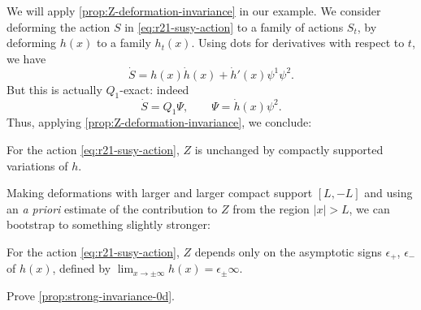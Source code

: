\documentclass[12pt,letterpaper,reqno]{article}
\numberwithin{equation}{section}
\newcommand{\abs}[1]{\lvert#1\rvert}
\newcommand{\IP}[1]{\langle#1\rangle}
\newcommand{\eps}{\epsilon}
\newcommand{\ti}[1]{\textit{#1}}
\begin{document}
We will apply \autoref{prop:Z-deformation-invariance} in our example.
We consider deforming the action $S$ in \eqref{eq:r21-susy-action} 
to a family of actions $S_t$, by deforming $h(x)$
to a family $h_t(x)$.
Using dots for derivatives with respect to $t$, we have
\begin{equation}
  \dot S = h(x) {\dot h}(x) + {\dot h}'(x) \psi^1 \psi^2. 
\end{equation}
But this is actually $Q_1$-exact: indeed
\begin{equation} \label{eq:psi-example}
  \dot S = Q_1 \Psi, \qquad \Psi = {\dot h}(x) \psi^2.
\end{equation}
Thus, applying \autoref{prop:Z-deformation-invariance},
we conclude:
\begin{prop} 
For the action \eqref{eq:r21-susy-action}, 
$Z$ is unchanged by compactly supported variations of $h$.
\end{prop}

Making deformations with larger and larger compact support $[L,-L]$ and
using an \ti{a priori} estimate of the contribution to $Z$ from
the region $\abs{x} > L$, we can bootstrap to something slightly stronger:
\begin{prop} \label{prop:strong-invariance-0d}
For the action \eqref{eq:r21-susy-action}, 
$Z$ depends only on the asymptotic signs $\eps_+$, $\eps_-$ of $h(x)$,
defined by $\lim_{x \to \pm \infty} h(x) = \eps_{\pm} \infty$.
\end{prop}

\begin{exercise} Prove \autoref{prop:strong-invariance-0d}.
\end{exercise}
\end{document}
